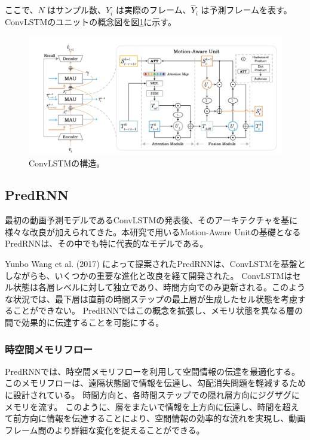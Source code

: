       ここで、\( N \) はサンプル数、\( Y_i \) は実際のフレーム、\( \hat{Y}_i \) は予測フレームを表す。
      ConvLSTMのユニットの概念図を図\ref{fig:convlstm}に示す。
      \begin{figure}[h]
        \centering
        \includegraphics[width=\textwidth]{figures/mau.png}
        \caption{ConvLSTMの構造。}
        \label{fig:convlstm}
      \end{figure}

    \subsection{PredRNN}

      最初の動画予測モデルであるConvLSTMの発表後、そのアーキテクチャを基に様々な改良が加えられてきた。本研究で用いるMotion-Aware Unitの基礎となるPredRNNは、その中でも特に代表的なモデルである。

      Yunbo Wang et al. (2017) によって提案されたPredRNNは、ConvLSTMを基盤としながらも、いくつかの重要な進化と改良を経て開発された。
      ConvLSTMはセル状態は各層レベルに対して独立であり、時間方向でのみ更新される。このような状況では、最下層は直前の時間ステップの最上層が生成したセル状態を考慮することができない。
      PredRNNではこの概念を拡張し、メモリ状態を異なる層の間で効果的に伝達することを可能にする。
        
      \subsubsection{時空間メモリフロー}
        PredRNNでは、時空間メモリフローを利用して空間情報の伝達を最適化する。このメモリフローは、遠隔状態間で情報を伝達し、勾配消失問題を軽減するために設計されている。
        時間方向と、各時間ステップでの隠れ層方向にジグザグにメモリを流す。
        このように、層をまたいで情報を上方向に伝達し、時間を超えて前方向に情報を伝達することにより、空間情報の効率的な流れを実現し、動画フレーム間のより詳細な変化を捉えることができる。
          
